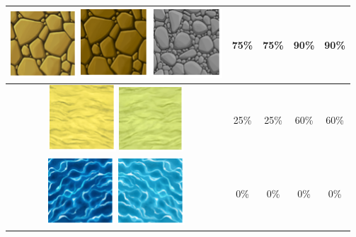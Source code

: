 \begin{table}[H]
\begin{tabular}{|c|c|c|c|c|}
        \hline
        \includegraphics{imagesTable/claroPiedra} \includegraphics{imagesTable/piedra} \includegraphics{imagesTable/grisPiedra} & 75\% & 75\% & 90\% & 90\% \\
        \hline
        \includegraphics{imagesTable/arena} \includegraphics{imagesTable/claroArena} & 25\% & 25\% & 60\% & 60\% \\
        \hline
        \includegraphics{imagesTable/agua} \includegraphics{imagesTable/claroAgua} & 0\% & 0\% & 0\% & 0\% \\

\end{tabular}
\end{table}
